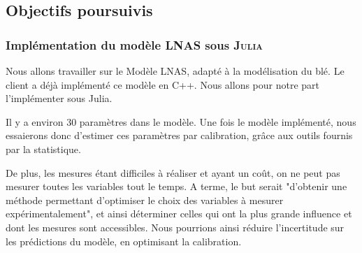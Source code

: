 \subsection{Objectifs poursuivis}
\subsubsection{Implémentation du modèle LNAS sous \textsc{Julia}}
Nous allons travailler sur le Modèle LNAS, adapté à la modélisation du blé. 
Le client a déjà implémenté ce modèle en C++. 
Nous allons pour notre part l'implémenter sous Julia.

Il y a environ 30 paramètres dans le modèle. Une fois le modèle implémenté, nous essaierons donc d'estimer ces paramètres par calibration, grâce aux outils fournis par la statistique.

De plus, les mesures étant difficiles à réaliser et ayant un coût, on ne peut pas mesurer toutes les variables tout le temps. A terme, le but serait "d'obtenir une méthode permettant d'optimiser le choix des variables à mesurer expérimentalement", et ainsi déterminer celles qui ont la plus grande influence et dont les mesures sont accessibles. Nous pourrions ainsi réduire l'incertitude sur les prédictions du modèle, en optimisant la calibration.


